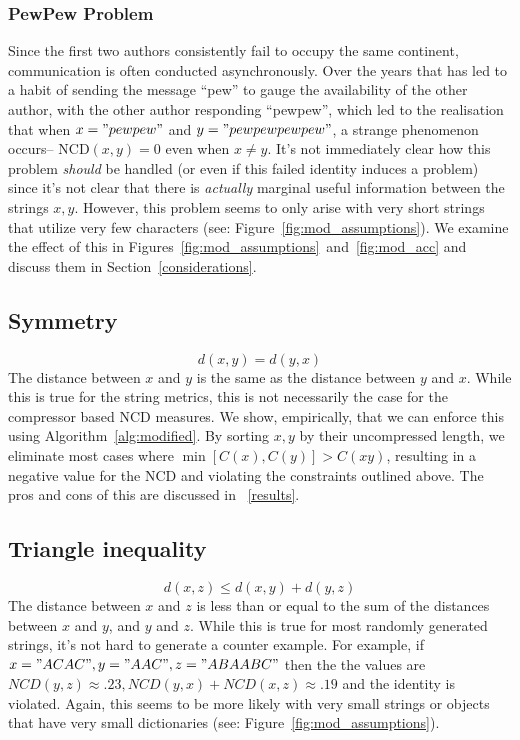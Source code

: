 \documentclass[conference]{IEEEtran}
\begin{document}
\subsubsection{PewPew Problem}
Since the first two authors consistently fail to occupy the same continent, communication is often conducted asynchronously. 
Over the years that has led to a habit of sending the message ``pew'' to gauge the availability of the other author, with the other author responding ``pewpew'', which led to the realisation that when $x = "pewpew"$ and $y="pewpewpewpew"$, a strange phenomenon occurs-- NCD$(x,y) = 0$ even when $x \neq y$. 
It's not immediately clear how this problem \textit{should} be handled (or even if this failed identity induces a problem) since it's not clear that there is \textit{actually} marginal useful information between the strings $x,y$. 
However, this problem seems to only arise with very short strings that utilize very few characters (see: Figure~\ref{fig:mod_assumptions}).
We examine the effect of this in Figures~\ref{fig:mod_assumptions}~and~\ref{fig:mod_acc} and discuss them in Section~\ref{considerations}.

\subsection{Symmetry} 
\[
d(x, y) = d(y, x)
\]
The distance between \( x \) and \( y \) is the same as the distance between \( y \) and \( x \). While this is true for the string metrics, this is not necessarily the case for the compressor based NCD measures. 
We show, empirically, that we can enforce this using Algorithm~\ref{alg:modified}. 
By sorting $x,y$ by their uncompressed length, we eliminate most cases where $\min[C(x), C(y)] > C(xy)$, resulting in a negative value for the NCD and violating the constraints outlined above.
The pros and cons of this are discussed in ~\ref{results}.

\subsection{Triangle inequality} 
\[
d(x, z) \leq d(x, y) + d(y, z)
\]
The distance between \( x \) and \( z \) is less than or equal to the sum of the distances between \( x \) and \( y \), and \( y \) and \( z \). While this is true for most randomly generated strings, it's not hard to generate a counter example. 
For example, if $ x = "ACAC", y = "AAC", z = "ABAABC" $ then the the values are $ NCD(y,z) \approx .23, NCD(y,x) + NCD(x,z) \approx .19 $ and the identity is violated. 
Again, this seems to be more likely with very small strings or objects that have very small dictionaries (see: Figure~\ref{fig:mod_assumptions}).
\end{document}

